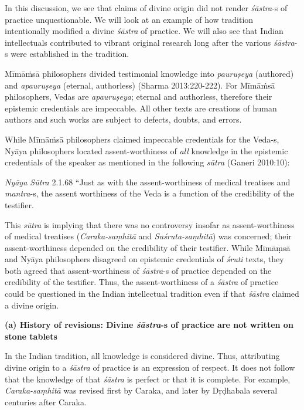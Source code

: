 In this discussion, we see that claims of divine origin did not render {\sl śāstra}-s of practice unquestionable. We will look at an example of how tradition intentionally modified a divine {\sl śāstra} of practice. We will also see that Indian intellectuals contributed to vibrant original research long after the various {\sl śāstra}-s were established in the tradition.

Mīmāṁsā philosophers divided testimonial knowledge into {\sl pauruṣeya} (authored) and {\sl apauruṣeya} (eternal, authorless) (Sharma 2013:220-222). For Mīmāṁsā philosophers, Vedas are {\sl apauruṣeya}; eternal and authorless, therefore their epistemic credentials are impeccable. All other texts are creations of human authors and such works are subject to defects, doubts, and errors.

While Mīmāṁsā philosophers claimed impeccable credentials for the Veda-s, Nyāya philosophers located assent-worthiness of {\sl all} knowledge in the epistemic credentials of the speaker as mentioned in the following {\sl sūtra} (Ganeri 2010:10):
\begin{myquote}
{{\sl Nyāya Sūtra}\relax}  2.1.68 ``Just as with the assent-worthiness of medical treatises and {\sl mantra}-s, the assent worthiness of the Veda is a function of the credibility of the testifier.
\end{myquote}

This {\sl sūtra} is implying that there was no controversy insofar as assent-worthiness of medical treatises ({\sl Caraka-saṃhitā} and {\sl Suśruta-saṃhitā}) was concerned; their assent-worthiness depended on the credibility of their testifier. While Mīmāṃsā and Nyāya philosophers disagreed on epistemic credentials of {\sl śruti} texts, they both agreed that assent-worthiness of {\sl śāstra}-s of practice depended on the credibility of the testifier. Thus, the assent-worthiness of a {\sl śāstra} of practice could be questioned in the Indian intellectual tradition even if that {\sl śāstra} claimed a divine origin.

{\bf (a) History of revisions: Divine {\sl\bfseries śāstra}-s of practice are not written on stone tablets}

In the Indian tradition, all knowledge is considered divine.  Thus, attributing divine origin to a {\sl śāstra} of practice is an expression of respect.  It does not follow that the knowledge of that {\sl śāstra} is perfect or that it is complete.  For example, {\sl Caraka-saṃhitā} was revised first by Caraka, and later by Dṛḍhabala several centuries after Caraka.

